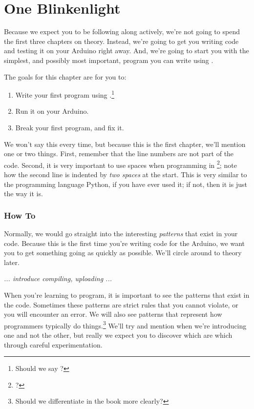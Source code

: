 \chapter{One Blinkenlight}

Because we expect you to be following along actively, we're not going to spend the first three chapters on theory. Instead, we're going to get you writing code and testing it on your Arduino right away. And, we're going to start you with the simplest, and possibly most important, program you can write using \plumbing.

\GOALS
The goals for this chapter are for you to:

\begin{enumerate}
	\item Write your first program using \plumbing.\footnote{Should we say \occam?}
	\item Run it on your Arduino.
	\item Break your first program, and fix it.
\end{enumerate}

\CODE


We won't say this every time, but because this is the first chapter, we'll mention one or two things. First, remember that the {\strong line numbers are not part of the code}. Second, it is very important to use spaces when programming in \occam\footnote{\plumbing?}; note how the second line is indented by {\em two spaces} at the start. This is very similar to the programming language Python, if you have ever used it; if not, then it is just the way it is.

\subsection{How To}
Normally, we would go straight into the interesting {\em patterns} that exist in your code. Because this is the first time you're writing \plumbing code for the Arduino, we want you to get something going as quickly as possible. We'll circle around to theory later.

{\em ... introduce compiling, uploading ...}

\PATTERNS
When you're learning to program, it is important to see the patterns that exist in the code. Sometimes these patterns are strict rules that you cannot violate, or you will encounter an error. We will also see patterns that represent how programmers typically do things.\footnote{Should we differentiate in the book more clearly?} We'll try and mention when we're introducing one and not the other, but really we expect you to discover which are which through careful experimentation.

